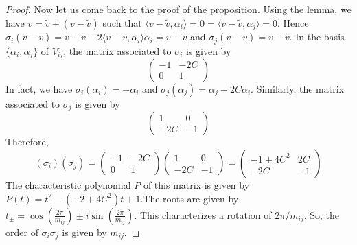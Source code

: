 \begin{proof}
Now let us come back to the proof of the proposition. Using the lemma, we have $v = \tilde{v} + (v- \tilde{v})$ such that $\langle v - \tilde{v} , \alpha_i \rangle = 0 = \langle v - \tilde{v}, \alpha_j \rangle = 0$. Hence $\sigma_i (v - \tilde{v}) = v- \tilde{v} - 2 \langle v - \tilde{v} , \alpha_i \rangle \alpha_i = v- \tilde{v}$ and $\sigma_j (v-\tilde{v}) = v - \tilde{v}$. In the basis $\{ \alpha_i, \alpha_j \}$ of $V_{ij}$, the matrix associated to $\sigma_i$ is given by
\begin{equation}
\begin{pmatrix}
-1 &-2 C \\
0 & 1
\end{pmatrix}
\end{equation} In fact, we have $\sigma_i (\alpha_i) = -\alpha_i$ and $\sigma_j (\alpha_j ) = \alpha_j - 2 C \alpha_i$. Similarly, the matrix associated to $\sigma_j$ is given by
\begin{equation}
\begin{pmatrix}
1 & 0 \\
-2C & -1
\end{pmatrix}
\end{equation} Therefore,
\begin{equation}
(\sigma_i) (\sigma_j) = \begin{pmatrix}
-1 &-2 C \\
0 & 1
\end{pmatrix} \begin{pmatrix}
1 & 0 \\
-2C & -1
\end{pmatrix} = \begin{pmatrix}
-1 + 4 C^2 & 2C \\
-2 C & -1
\end{pmatrix}
\end{equation} The characteristic polynomial $P$ of this matrix is given by $P(t) = t^2 - (-2 + 4 C^2 ) t + 1$.The roots are given by $t_\pm = \cos \left(\frac{2 \pi}{m_{ij}} \right) \pm i \sin \left( \frac{2 \pi}{m_{ij}} \right)$. This characterizes a rotation of $2 \pi / m_{ij}$. So, the order of $\sigma_i \sigma_j$ is given by $m_{ij}$. 

\end{proof}

